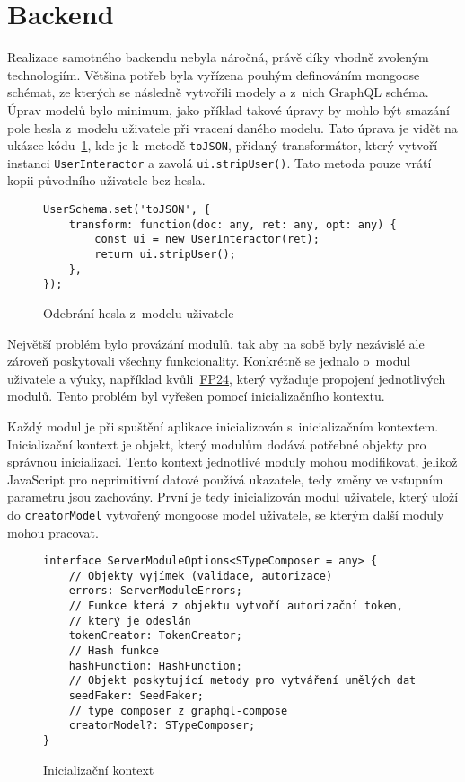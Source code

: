 \section{Backend}
\label{sc:backend}
Realizace samotného backendu nebyla náročná, právě díky vhodně zvoleným technologiím. Většina potřeb byla vyřízena pouhým definováním mongoose schémat, ze kterých se následně vytvořili modely a z~nich GraphQL schéma. Úprav modelů bylo minimum, jako příklad takové úpravy by mohlo být smazání pole hesla z~modelu uživatele při vracení daného modelu. Tato úprava je vidět na ukázce kódu~\ref{code:to_json_user}, kde je k~metodě \texttt{toJSON}, přidaný transformátor, který vytvoří instanci \texttt{UserInteractor} a zavolá \texttt{ui.stripUser()}. Tato metoda pouze vrátí kopii původního uživatele bez hesla.

\begin{figure}[h!]
    \centering
    \begin{verbatim}
UserSchema.set('toJSON', {
    transform: function(doc: any, ret: any, opt: any) {
        const ui = new UserInteractor(ret);
        return ui.stripUser();
    },
});
    \end{verbatim}
    \caption{Odebrání hesla z~modelu uživatele}
    \label{code:to_json_user}
\end{figure}

Největší problém bylo provázání modulů, tak aby na sobě byly nezávislé ale zároveň poskytovali všechny funkcionality. Konkrétně se jednalo o~modul uživatele a výuky, například kvůli~\hyperref[FP24]{FP24}, který vyžaduje propojení jednotlivých modulů. Tento problém byl vyřešen pomocí inicializačního kontextu.

Každý modul je při spuštění aplikace inicializován s~inicializačním kontextem. Inicializační kontext je objekt, který modulům dodává potřebné objekty pro správnou inicializaci. Tento kontext jednotlivé moduly mohou modifikovat, jelikož JavaScript pro neprimitivní datové používá ukazatele, tedy změny ve vstupním parametru jsou zachovány. První je tedy inicializován modul uživatele, který uloží do \texttt{creatorModel} vytvořený mongoose model uživatele, se kterým další moduly mohou pracovat.

\begin{figure}[h!]
    \centering
    \begin{verbatim}
interface ServerModuleOptions<STypeComposer = any> {
    // Objekty vyjímek (validace, autorizace)
    errors: ServerModuleErrors;
    // Funkce která z objektu vytvoří autorizační token,
    // který je odeslán
    tokenCreator: TokenCreator;
    // Hash funkce
    hashFunction: HashFunction; 
    // Objekt poskytující metody pro vytváření umělých dat
    seedFaker: SeedFaker;
    // type composer z graphql-compose
    creatorModel?: STypeComposer; 
}
    \end{verbatim}
    \caption{Inicializační kontext}
    \label{code:server_module_options}
\end{figure}

